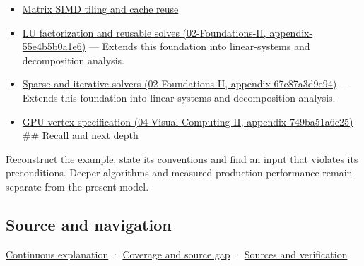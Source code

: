 \begin{itemize}
\item
  \hyperref[appendix-1bfb7c657105]{Matrix SIMD tiling and cache reuse}
\item
  \href{../02-Foundations-II/main.pdf\#nameddest=appendix-55e4b5b0a1e6}{LU factorization and reusable solves (02-Foundations-II, appendix-55e4b5b0a1e6)} --- Extends this foundation into linear-systems and decomposition analysis.
\item
  \href{../02-Foundations-II/main.pdf\#nameddest=appendix-67c87a3d9e94}{Sparse and iterative solvers (02-Foundations-II, appendix-67c87a3d9e94)} --- Extends this foundation into linear-systems and decomposition analysis.
\item
  \href{../04-Visual-Computing-II/main.pdf\#nameddest=appendix-749ba51a6c25}{GPU vertex specification (04-Visual-Computing-II, appendix-749ba51a6c25)} \#\# Recall and next depth
\end{itemize}

Reconstruct the example, state its conventions and find an input that violates its preconditions. Deeper algorithms and measured production performance remain separate from the present model.

\subsection{Source and navigation}\label{appendix-ffdc1d4e5350-source-and-navigation}

\hyperref[01-foundations-i-ch018-keep-the-promises-visible-while-moving-between-representations]{Continuous explanation} · \hyperref[appendix-fd090d982a15-phase-7---parts-601-700]{Coverage and source gap} · \hyperref[appendix-a103e7846d21-phase-7---source-analysis-and-verification]{Sources and verification}
